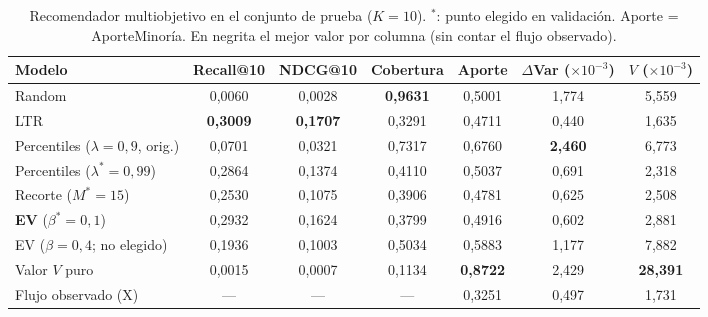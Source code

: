 \begin{table}[ht]
\centering
\footnotesize
\caption{Recomendador multiobjetivo en el conjunto de prueba ($K=10$). $^*$: punto elegido en validación. Aporte = AporteMinoría. En negrita el mejor valor por columna (sin contar el flujo observado).}
\label{tab:activo_principal}
\setlength{\tabcolsep}{4pt}
\begin{tabular}{@{}l cccccc@{}}
\toprule
\textbf{Modelo} & \textbf{Recall@10} & \textbf{NDCG@10} & \textbf{Cobertura} & \textbf{Aporte} & \shortstack{\textbf{$\Delta$Var}\\($\times10^{-3}$)} & \shortstack{\textbf{$V$}\\($\times10^{-3}$)} \\ \midrule
Random & 0{,}0060 & 0{,}0028 & \textbf{0{,}9631} & 0{,}5001 & 1{,}774 & 5{,}559 \\
LTR & \textbf{0{,}3009} & \textbf{0{,}1707} & 0{,}3291 & 0{,}4711 & 0{,}440 & 1{,}635 \\
\midrule
Percentiles ($\lambda=0{,}9$, orig.) & 0{,}0701 & 0{,}0321 & 0{,}7317 & 0{,}6760 & \textbf{2{,}460} & 6{,}773 \\
Percentiles ($\lambda^*=0{,}99$) & 0{,}2864 & 0{,}1374 & 0{,}4110 & 0{,}5037 & 0{,}691 & 2{,}318 \\
Recorte ($M^*=15$) & 0{,}2530 & 0{,}1075 & 0{,}3906 & 0{,}4781 & 0{,}625 & 2{,}508 \\
\textbf{EV} ($\beta^*=0{,}1$) & 0{,}2932 & 0{,}1624 & 0{,}3799 & 0{,}4916 & 0{,}602 & 2{,}881 \\
EV ($\beta=0{,}4$; no elegido) & 0{,}1936 & 0{,}1003 & 0{,}5034 & 0{,}5883 & 1{,}177 & 7{,}882 \\
Valor $V$ puro & 0{,}0015 & 0{,}0007 & 0{,}1134 & \textbf{0{,}8722} & 2{,}429 & \textbf{28{,}391} \\
\midrule
Flujo observado (X) & --- & --- & --- & 0{,}3251 & 0{,}497 & 1{,}731 \\
\bottomrule
\end{tabular}
\end{table}
